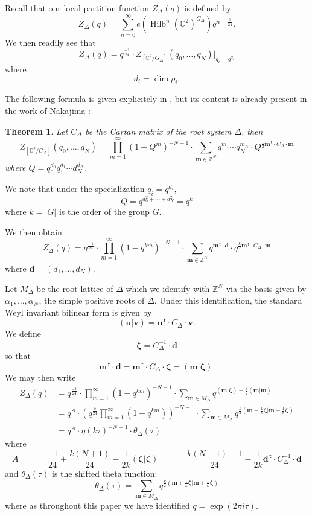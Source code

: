 \documentclass{article}
\newtheorem{theorem}{Theorem}[section]
\theoremstyle{definition}
\newcommand{\half}{\frac{1}{2}}
\newcommand{\CC} {{\mathbb C}}          %
\newcommand{\ZZ} {{\mathbb Z}}		%
\renewcommand{\top}{\,\mathsf{t}}
\newcommand{\mvec}{\bm{m}}
\newcommand{\zetavec}{\bm{\zeta }}
\newcommand{\dvec}{\bm{d }}
\newcommand{\uvec}{\bm{u }}
\newcommand{\vvec}{\bm{v }}
\newcommand{\Hilb}{\operatorname{Hilb}}
\begin{document}
Recall that our local partition function $Z_{\Delta}(q)$ is defined by
\[
Z_{\Delta}(q) = \sum_{n=0}^{\infty}
e\left(\Hilb^{n}(\CC^{2})^{G_{\Delta}} \right) q^{n-\frac{1}{24}}. 
\]
We then readily see that
\[
Z_{\Delta}(q) = q^{\frac{-1}{24}}\cdot  Z_{[\CC^{2}/G_{\Delta}]}
(q_{0},\dotsc ,q_{N})|_{q_{i}=q^{d_{i}}}
\]
where
\[
d_{i} =\dim \rho_{i}.
\]

The following formula is given explicitely in \cite[Thm~1.3]{gyenge2015euler}, but its content is already present in the work of Nakajima \cite{nakajima2002geometric}:
\begin{theorem} \label{thm: Zorbifold formula}
Let $C_{\Delta}$ be the Cartan matrix of the root system $\Delta$,
then 
\[
Z_{[\CC^{2}/G_{\Delta}]} (q_{0},\dotsc ,q_{N}) = \prod_{m=1}^{\infty}
(1-Q^{m})^{-N-1} \cdot \sum_{\mvec \in \ZZ^{N}} q_{1}^{m_{1}}\dotsb
q_{N}^{m_{N}} \cdot Q^{\half \mvec^{\top}\cdot C_{\Delta}\cdot \mvec}
\]
where $Q=q_{0}^{d_{0}}q_{1}^{d_{1}}\dotsb d_{N}^{d_{N}}$.
\end{theorem}
We note that under the specialization $q_{i}=q^{d_{i}}$, 
\[
Q=q^{d_{0}^{2}+\dotsb +d_{N}^{2}} = q^{k}
\]
where $k=|G|$ is the order of the group $G$.

We then obtain
\[
Z_{\Delta}(q) = q^{\frac{-1}{24}}\cdot
\prod_{m=1}^{\infty}(1-q^{km})^{-N-1} \cdot \sum_{\mvec \in \ZZ^{N}}
q^{\mvec^{\top}\cdot \dvec} \cdot q^{\frac{k}{2}\mvec^{\top}\cdot C_{\Delta}\cdot \mvec}
\]
where $\dvec =(d_{1},\dotsc ,d_{N})$.

Let $M_{\Delta}$ be the root lattice of $\Delta$ which we identify
with $\ZZ^{N}$ via the basis given by $\alpha_{1},\dotsc ,\alpha_{N}$,
the simple positive roots of $\Delta$. Under this identification, the
standard Weyl invariant bilinear form is given by
\[
(\uvec |\vvec ) = \uvec^{\top}\cdot C_{\Delta}\cdot \vvec .
\]
We define
\[
\zetavec = C_{\Delta}^{-1} \cdot \dvec 
\]
so that 
\[
\mvec^{\top}\cdot \dvec = \mvec^{\top}\cdot C_{\Delta} \cdot \zetavec
= (\mvec |\zetavec ).
\]
We may then write
\begin{align*}
Z_{\Delta}(q)& = q^{\frac{-1}{24}}\cdot
\prod_{m=1}^{\infty}(1-q^{km})^{-N-1}\cdot \sum _{\mvec \in M_{\Delta}} q^{(\mvec |\zetavec )+\frac{k}{2}(\mvec |\mvec)}\\
&= q^{A} \cdot \left(q^{\frac{k}{24}}\prod_{m=1}^{\infty}(1-q^{km})
\right)^{-N-1} \cdot \sum_{\mvec \in M_{\Delta}} q^{\frac{k}{2}\left(\mvec +\frac{1}{k}\zetavec |\mvec +\frac{1}{k}\zetavec  \right)}\\
& = q^{A}\cdot  \eta (k\tau )^{-N-1}\cdot  \theta_{\Delta} (\tau )
\end{align*}
where 
\[
A \quad = \quad \frac{-1}{24} + \frac{k(N+1)}{24} - \frac{1}{2k}(\zetavec
|\zetavec ) \quad = \quad \frac{k(N+1)-1}{24} - \frac{1}{2k}\dvec^{\top}\cdot
C_{\Delta}^{-1} \cdot \dvec 
\]
and $\theta_{\Delta}(\tau )$ is the shifted theta function:
\[
\theta_{\Delta}(\tau ) = \sum_{\mvec \in M_{\Delta}} q^{\frac{k}{2}\left(\mvec +\frac{1}{k}\zetavec |\mvec +\frac{1}{k}\zetavec  \right)}
\]
where as throughout this paper we have identified $q=\exp\left(2\pi i\tau  \right)$.
\end{document}
